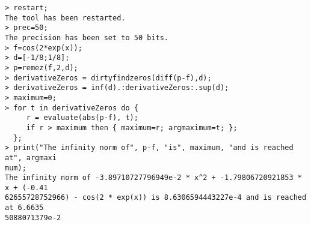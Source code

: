 \begin{center}\begin{minipage}{15cm}\begin{Verbatim}[frame=single]
> restart;
The tool has been restarted.
> prec=50;
The precision has been set to 50 bits.
> f=cos(2*exp(x));
> d=[-1/8;1/8];
> p=remez(f,2,d);
> derivativeZeros = dirtyfindzeros(diff(p-f),d);
> derivativeZeros = inf(d).:derivativeZeros:.sup(d);
> maximum=0;
> for t in derivativeZeros do {
     r = evaluate(abs(p-f), t);
     if r > maximum then { maximum=r; argmaximum=t; };
  };
> print("The infinity norm of", p-f, "is", maximum, "and is reached at", argmaxi
mum);
The infinity norm of -3.89710727796949e-2 * x^2 + -1.79806720921853 * x + (-0.41
62655728752966) - cos(2 * exp(x)) is 8.6306594443227e-4 and is reached at 6.6635
5088071379e-2
\end{Verbatim}
\end{minipage}\end{center}
